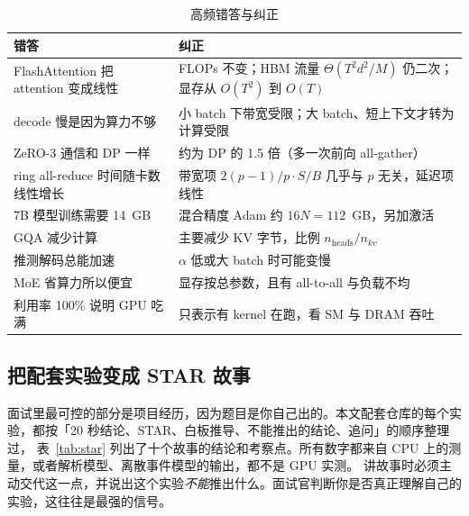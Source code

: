 \begin{table}[!t]
\centering
\caption{高频错答与纠正}
\label{tab:wrong}
\footnotesize
\begin{tabularx}{\columnwidth}{@{}L{3.0cm} Y@{}}
\toprule
错答 & 纠正 \\
\midrule
FlashAttention 把 attention 变成线性 & FLOPs 不变；HBM 流量 $\Theta(T^2d^2/M)$ 仍二次；显存从 $O(T^2)$ 到 $O(T)$ \\
decode 慢是因为算力不够 & 小 batch 下带宽受限；大 batch、短上下文才转为计算受限 \\
ZeRO-3 通信和 DP 一样 & 约为 DP 的 1.5 倍（多一次前向 all-gather） \\
ring all-reduce 时间随卡数线性增长 & 带宽项 $2(p-1)/p\cdot S/B$ 几乎与 $p$ 无关，延迟项线性 \\
7B 模型训练需要 14~GB & 混合精度 Adam 约 $16N=112$~GB，另加激活 \\
GQA 减少计算 & 主要减少 KV 字节，比例 $n_{\text{heads}}/n_{kv}$ \\
推测解码总能加速 & $\alpha$ 低或大 batch 时可能变慢 \\
MoE 省算力所以便宜 & 显存按总参数，且有 all-to-all 与负载不均 \\
利用率 100\% 说明 GPU 吃满 & 只表示有 kernel 在跑，看 SM 与 DRAM 吞吐 \\
\bottomrule
\end{tabularx}
\end{table}

\subsection{把配套实验变成 STAR 故事}

面试里最可控的部分是项目经历，因为题目是你自己出的。本文配套仓库的每个实验，都按「20 秒结论、STAR、白板推导、不能推出的结论、追问」的顺序整理过，
表~\ref{tab:star} 列出了十个故事的结论和考察点。所有数字都来自 CPU 上的测量，或者解析模型、离散事件模型的输出，都不是 GPU 实测。
讲故事时必须主动交代这一点，并说出这个实验\emph{不能}推出什么。面试官判断你是否真正理解自己的实验，这往往是最强的信号。

